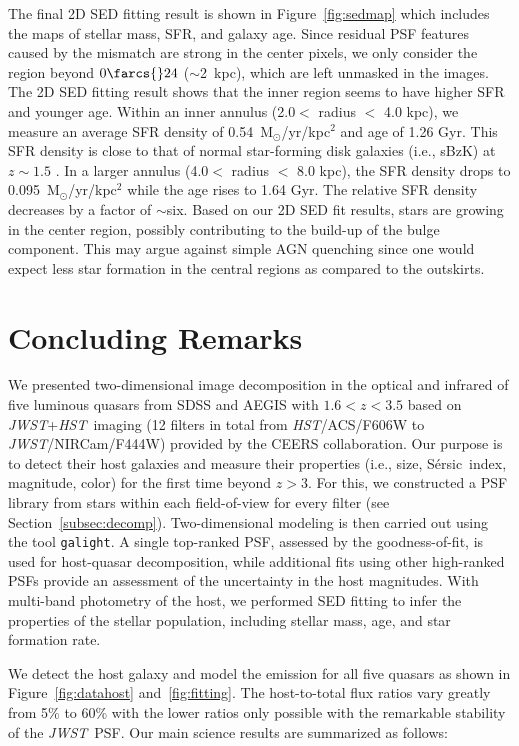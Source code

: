 \documentclass[twocolumn]{aastex631}
\newcommand{\sersic}{S\'ersic}
\newcommand{\galight}{\texttt{galight}}
\newcommand{\hst}{{\it HST}}
\newcommand{\jwst}{{\it JWST}}
\begin{document}
The final 2D SED fitting result is shown in Figure~\ref{fig:sedmap} which includes the maps of stellar mass, SFR, and galaxy age. Since residual PSF features caused by the mismatch are strong in the center pixels, we only consider the region beyond $0\farcs{}24$ ($\sim$2~kpc), which are left unmasked in the images. The 2D SED fitting result shows that the inner region seems to have higher SFR and younger age. 
Within an inner annulus (2.0$<$ radius $<$ 4.0 kpc), we measure an average SFR density of 0.54~M$_{\odot}$/yr/kpc$^2$ and age of 1.26 Gyr. This SFR density is close to that of normal star-forming disk galaxies (i.e., sBzK) at $z\sim1.5$ \citep{Daddi2010}. In a larger annulus (4.0$<$ radius $<$ 8.0 kpc), the SFR density drops to 0.095~M$_{\odot}$/yr/kpc$^2$ while the age rises to 1.64 Gyr. The relative SFR density decreases by a factor of $\sim$six. 
Based on our 2D SED fit results, stars are growing in the center region, possibly contributing to the build-up of the bulge component. This may argue against simple AGN quenching since one would expect less star formation in the central regions as compared to the outskirts. 
\newpage


\section{Concluding Remarks}\label{sec:conclusion}

We presented two-dimensional image decomposition in the optical and infrared of five luminous quasars from SDSS and AEGIS with $1.6<z<3.5$ based on \jwst+\hst\ imaging (12 filters in total from \hst/ACS/F606W to \jwst/NIRCam/F444W) provided by the CEERS collaboration. Our purpose is to detect their host galaxies and measure their properties (i.e., size, \sersic\ index, magnitude, color) for the first time beyond $z>3$. For this, we constructed a PSF library from stars within each field-of-view for every filter (see Section~\ref{subsec:decomp}). Two-dimensional modeling is then carried out using the tool \galight. A single top-ranked PSF, assessed by the goodness-of-fit, is used for host-quasar decomposition, while additional fits using other high-ranked PSFs provide an assessment of the uncertainty in the host magnitudes. With multi-band photometry of the host, we performed SED fitting to infer the properties of the stellar population, including stellar mass, age, and star formation rate.

We detect the host galaxy and model the emission for all five quasars as shown in Figure~\ref{fig:datahost} and~\ref{fig:fitting}. The host-to-total flux ratios vary greatly from 5\% to 60\% with the lower ratios only possible with the remarkable stability of the \jwst\ PSF. Our main science results are summarized as follows:
\end{document}
